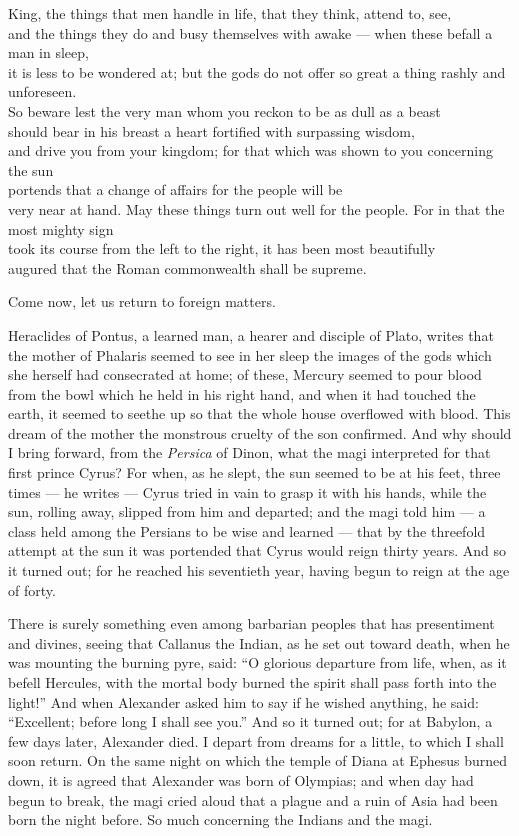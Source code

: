  King, the things that men handle in life, that they think, attend to, see, \\
and the things they do and busy themselves with awake — when these befall a man in sleep, \\
it is less to be wondered at; but the gods do not offer so great a thing rashly and unforeseen. \\
So beware lest the very man whom you reckon to be as dull as a beast \\
should bear in his breast a heart fortified with surpassing wisdom, \\
and drive you from your kingdom; for that which was shown to you concerning the sun \\
portends that a change of affairs for the people will be \\
very near at hand. May these things turn out well for the people. For in that the most mighty sign \\
took its course from the left to the right, it has been most beautifully \\
augured that the Roman commonwealth shall be supreme.

Come now, let us return to foreign matters.

 Heraclides of Pontus, a learned man, a hearer and disciple of Plato, writes that the mother of Phalaris seemed to see in her sleep the images of the gods which she herself had consecrated at home; of these, Mercury seemed to pour blood from the bowl which he held in his right hand, and when it had touched the earth, it seemed to seethe up so that the whole house overflowed with blood. This dream of the mother the monstrous cruelty of the son confirmed. And why should I bring forward, from the \textit{Persica} of Dinon, what the magi interpreted for that first prince Cyrus? For when, as he slept, the sun seemed to be at his feet, three times — he writes — Cyrus tried in vain to grasp it with his hands, while the sun, rolling away, slipped from him and departed; and the magi told him — a class held among the Persians to be wise and learned — that by the threefold attempt at the sun it was portended that Cyrus would reign thirty years. And so it turned out; for he reached his seventieth year, having begun to reign at the age of forty.

 There is surely something even among barbarian peoples that has presentiment and divines, seeing that Callanus the Indian, as he set out toward death, when he was mounting the burning pyre, said: ``O glorious departure from life, when, as it befell Hercules, with the mortal body burned the spirit shall pass forth into the light!'' And when Alexander asked him to say if he wished anything, he said: ``Excellent; before long I shall see you.'' And so it turned out; for at Babylon, a few days later, Alexander died. I depart from dreams for a little, to which I shall soon return. On the same night on which the temple of Diana at Ephesus burned down, it is agreed that Alexander was born of Olympias; and when day had begun to break, the magi cried aloud that a plague and a ruin of Asia had been born the night before. So much concerning the Indians and the magi.

